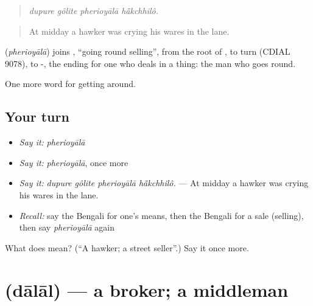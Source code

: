 \begin{quote}
   
\end{quote}

\begin{quote}
\emph{dupure gôlite pherioyālā hā̃kchhilô.}
\end{quote}

\begin{quote}
At midday a hawker was crying his wares in the lane.
\end{quote}

\begin{cousinweb}
\textbf{} (\emph{pherioyālā}) joins , \textquotedblleft{}going round selling\textquotedblright{}, from the root of , to turn (CDIAL 9078), to -, the ending for one who deals in a thing: the man who goes round.
\end{cousinweb}

\begin{grammarlens}[title={What you've built}]
One more word for getting around.
\end{grammarlens}

\subsection*{Your turn}
\begin{itemize}
\raggedright
  \item \emph{Say it:} \emph{pherioyālā}
  \item \emph{Say it:} \emph{pherioyālā}, once more
  \item \emph{Say it:} \emph{dupure gôlite pherioyālā hā̃kchhilô.} — At midday a hawker was crying his wares in the lane.
  \item \emph{Recall:} say the Bengali for one's means, then the Bengali for a sale (selling), then say \emph{pherioyālā} again
\end{itemize}

\begin{tcolorbox}[breakable,colback=teal!4,colframe=teal!35!black,title={Before you move on}]
What does  mean? (\textquotedblleft{}A hawker; a street seller\textquotedblright{}.) Say it once more.
\end{tcolorbox}
\section[\texorpdfstring{\bn{দালাল} (dālāl)}{দালাল (dālāl)}]{ (dālāl) — a broker; a middleman}

